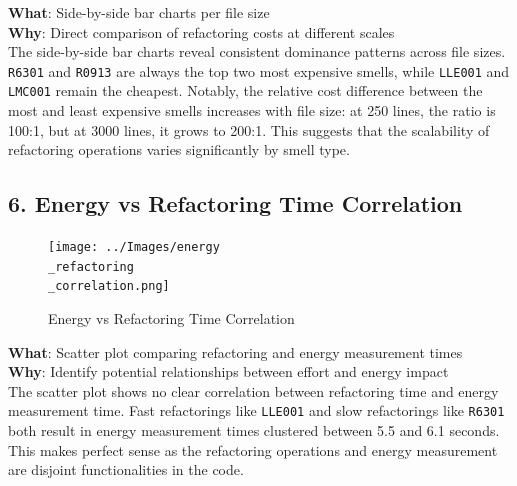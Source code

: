 \documentclass[12pt, titlepage]{article}
\begin{document}
\noindent \textbf{What}: Side-by-side bar charts per file size\\

\noindent \textbf{Why}: Direct comparison of refactoring costs at
different scales\\

The side-by-side bar charts reveal consistent dominance patterns
across file sizes. \texttt{R6301} and \texttt{R0913} are always the
top two most expensive smells, while \texttt{LLE001} and
\texttt{LMC001} remain the cheapest. Notably, the relative cost
difference between the most and least expensive smells increases with
file size: at 250 lines, the ratio is 100:1, but at 3000 lines, it
grows to 200:1. This suggests that the scalability of refactoring
operations varies significantly by smell type.

\subsection*{6. Energy vs Refactoring Time Correlation}

\begin{figure}[H]
  \centering
  \texttt{[image: ../Images/energy\\\_refactoring\\\_correlation.png]}
  \caption{Energy vs Refactoring Time Correlation}
\end{figure}

\noindent \textbf{What}: Scatter plot comparing refactoring and
energy measurement times\\

\noindent \textbf{Why}: Identify potential relationships between
effort and energy impact\\

The scatter plot shows no clear correlation between refactoring time
and energy measurement time. Fast refactorings like \texttt{LLE001}
and slow refactorings like \texttt{R6301} both result in energy
measurement times clustered between 5.5 and 6.1 seconds. This makes
perfect sense as the refactoring operations and energy measurement
are disjoint functionalities in the code.
\end{document}
